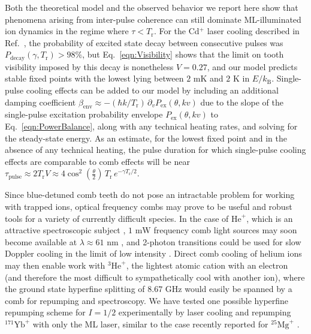 \documentclass[preprint,superscriptaddress,amsmath,amssymb,aps,prl]{revtex4-1}
\begin{document}
Both the theoretical model and the observed behavior we report here show that phenomena arising from inter-pulse coherence can still dominate ML-illuminated ion dynamics in the regime where $\tau < T_\mathrm{r}$.  For the Cd$^+$ laser cooling described in Ref.~\cite{Blinov2006broadband}, the probability of excited state decay between consecutive pulses was $P_\mathrm{decay}(\gamma, T_\mathrm{r})>98\%$, but Eq.~\ref{eqn:Visibility} shows that the limit on tooth visibility imposed by this decay is nonetheless $V=0.27$, and our model predicts stable fixed points with the lowest lying between $2 \mbox{ mK}$ and $2 \mbox{ K}$ in $E/k_\mathrm{B}$.  Single-pulse cooling effects can be added to our model by including an additional damping coefficient $\beta_\mathrm{env} \approx -(\hbar k/T_\mathrm{r})\, \partial_v P_\mathrm{ex}(\theta, kv)$ due to the slope of the single-pulse excitation probability envelope $P_\mathrm{ex}(\theta, kv)$ to Eq.~\ref{eqn:PowerBalance}, along with any technical heating rates, and solving for the steady-state energy.  As an estimate, for the lowest fixed point and in the absence of any technical heating, the pulse duration for which single-pulse cooling effects are comparable to comb effects will be near $\tau_\mathrm{pulse} \approx 2 T_\mathrm{r} V \approx 4\cos^2(\frac{\theta}{2})\, T_\mathrm{r} \,e^{-\gamma T_\mathrm{r}/2}$.

Since blue-detuned comb teeth do not pose an intractable problem for working with trapped ions, optical frequency combs may prove to be useful and robust tools for a variety of currently difficult species. In the case of $\mathrm{He}^+$, which is an attractive spectroscopic subject \cite{Herrmann2009feasibility}, $1\mbox{ mW}$ frequency comb light sources may soon become available at $\lambda \approx 61\mbox{ nm}$ \cite{Porat2017phase}, and 2-photon transitions could be used for slow Doppler cooling in the limit of low intensity \cite{Jayich2016direct}. Direct comb cooling of helium ions may then enable work with ${}^3\mathrm{He}^+$, the lightest atomic cation with an electron (and therefore the most difficult to sympathetically cool with another ion), where the ground state hyperfine splitting of $8.67\mbox{ GHz}$ \cite{Schuessler1969hyperfine} would easily be spanned by a comb for repumping and spectroscopy. We have tested one possible hyperfine repumping scheme for $I=1/2$ experimentally by laser cooling and repumping ${}^{171}\mbox{Yb}^+$ with only the ML laser, similar to the case recently reported for ${}^{25}\mathrm{Mg}^+$ \cite{DavilaRodriguez2016doppler}.
\end{document}
